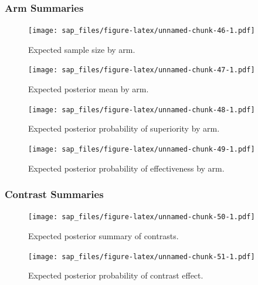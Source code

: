 \documentclass[
  bibliography=totoc]{scrreprt}
\begin{document}
\hypertarget{arm-summaries-3}{%
\subsubsection{Arm Summaries}\label{arm-summaries-3}}

\begin{figure}
\centering
\texttt{[image: sap\_files/figure-latex/unnamed-chunk-46-1.pdf]}
\caption{\label{fig:unnamed-chunk-46}Expected sample size by arm.}
\end{figure}

\begin{figure}
\centering
\texttt{[image: sap\_files/figure-latex/unnamed-chunk-47-1.pdf]}
\caption{\label{fig:unnamed-chunk-47}Expected posterior mean by arm.}
\end{figure}

\begin{figure}
\centering
\texttt{[image: sap\_files/figure-latex/unnamed-chunk-48-1.pdf]}
\caption{\label{fig:unnamed-chunk-48}Expected posterior probability of superiority by arm.}
\end{figure}

\begin{figure}
\centering
\texttt{[image: sap\_files/figure-latex/unnamed-chunk-49-1.pdf]}
\caption{\label{fig:unnamed-chunk-49}Expected posterior probability of effectiveness by arm.}
\end{figure}

\clearpage

\hypertarget{contrast-summaries-3}{%
\subsubsection{Contrast Summaries}\label{contrast-summaries-3}}

\begin{figure}
\centering
\texttt{[image: sap\_files/figure-latex/unnamed-chunk-50-1.pdf]}
\caption{\label{fig:unnamed-chunk-50}Expected posterior summary of contrasts.}
\end{figure}

\begin{figure}
\centering
\texttt{[image: sap\_files/figure-latex/unnamed-chunk-51-1.pdf]}
\caption{\label{fig:unnamed-chunk-51}Expected posterior probability of contrast effect.}
\end{figure}

\renewcommand\refname{References}

\end{document}
